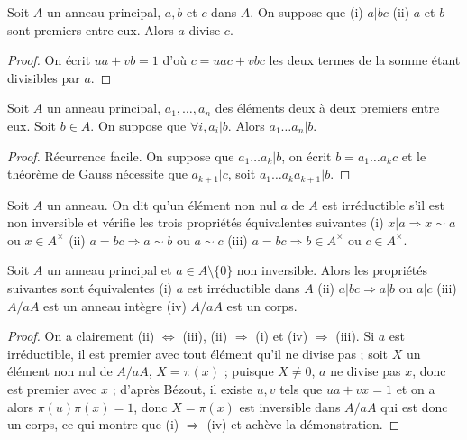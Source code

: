 \begin{thm}[Gauss]
Soit $A$ un anneau principal, $a,b$ et $c$ dans $A$. On
suppose que (i) $a | bc$ (ii) $a$ et $b$ sont
premiers entre eux. Alors $a$ divise $c$.
\end{thm}

\begin{proof}
On écrit $ua + vb = 1$ d'où $c = uac + vbc$ les deux termes de
la somme étant divisibles par $a$.
\end{proof}

\begin{cor}
Soit $A$ un anneau principal,
$a_1, \ldots, a_n$
des éléments deux à deux premiers entre eux. Soit $b \in A$. On suppose que
$\forall i, a_i | b$.
Alors
$a_1 \ldots a_n | b$.
\end{cor}

\begin{proof}
Récurrence facile. On suppose que
$a_1 \ldots a_k | b$,
on écrit $b = a_1 \ldots a_k c$
et le théorème de Gauss nécessite que
$a_{k+1} | c$, soit
$a_1 \ldots a_k a_{k+1} | b$.
\end{proof}

\begin{de}
Soit $A$ un anneau. On dit qu'un élément non nul $a$ de $A$
est irréductible s'il est non inversible et vérifie les trois propriétés
équivalentes suivantes (i) $x | a \Rightarrow x \sim a$ ou $x \in A^\times$ (ii) $a = bc \Rightarrow a \sim b$ ou $a \sim c$ (iii) $a = bc \Rightarrow b \in A^\times$ ou $c \in A^\times$.
\end{de}

\begin{thm}
Soit $A$ un anneau principal et $a \in A \setminus \{0\}$ non inversible. Alors les
propriétés suivantes sont équivalentes (i) $a$ est irréductible dans $A$
(ii) $a | bc \Rightarrow a | b$ ou $a | c$ (iii) $A/aA$ est un anneau intègre (iv)
$A/aA$ est un corps.
\end{thm}

\begin{proof}
On a clairement (ii) $\Leftrightarrow$ (iii),
(ii) $\Rightarrow$ (i) et (iv) $\Rightarrow$ (iii). Si $a$ est irréductible, il est premier avec
tout élément qu'il ne divise pas ; soit $X$ un élément non nul de $A/aA$, $X = \pi(x)$ ; puisque $X \neq 0$, $a$ ne divise pas $x$, donc
est premier avec $x$ ; d'après Bézout, il existe $u,v$ tels que $ua + vx = 1$
et on a alors $\pi(u)\pi(x) = 1$, donc $X = \pi(x)$ est inversible dans $A/aA$ qui
est donc un corps, ce qui montre que (i) $\Rightarrow$ (iv) et achève la
démonstration.
\end{proof}

